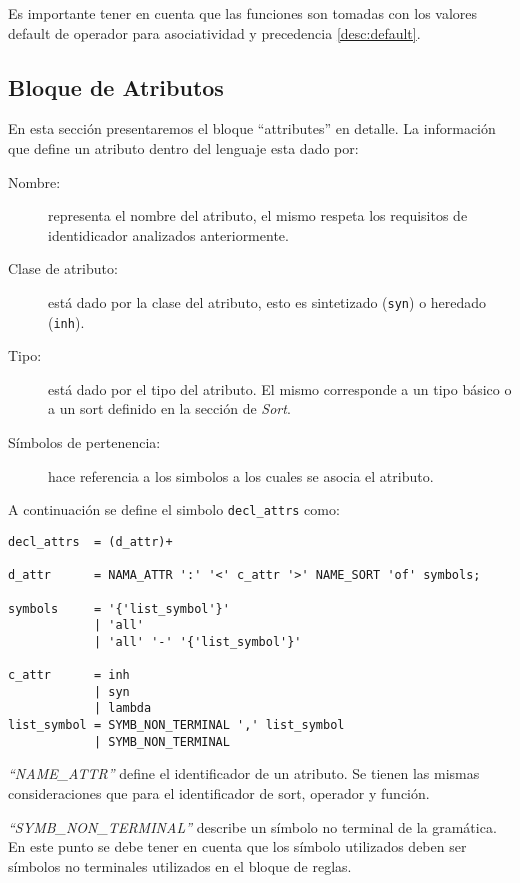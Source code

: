 Es importante tener en cuenta que las funciones son tomadas con los valores default de operador para asociatividad y precedencia \ref{desc:default}.\\
\subsection{Bloque de Atributos}
En esta sección presentaremos el bloque ``attributes'' en detalle. La información que define un atributo dentro del lenguaje esta dado por: 
\begin{description}
\item [Nombre:] representa el nombre del atributo, el mismo respeta los requisitos de identidicador analizados anteriormente.
\item [Clase de atributo:] está dado por la clase del atributo, esto es sintetizado (\texttt{syn}) o heredado (\texttt{inh}).
\item [Tipo:] está dado por el tipo del atributo. El mismo corresponde a un tipo básico o a un sort definido en la sección de \textit{Sort}.
\item [Símbolos de pertenencia:] hace referencia a los simbolos a los cuales se asocia el atributo.
\end{description}

A continuación se define el simbolo \texttt{decl\_attrs} como:
\begin{center}
\lstset{language=inform}
\scriptsize
\begin{lstlisting}[frame=single]
decl_attrs  = (d_attr)+ 

d_attr      = NAMA_ATTR ':' '<' c_attr '>' NAME_SORT 'of' symbols;

symbols     = '{'list_symbol'}' 
            | 'all'
            | 'all' '-' '{'list_symbol'}'

c_attr      = inh
            | syn
            | lambda
list_symbol = SYMB_NON_TERMINAL ',' list_symbol
            | SYMB_NON_TERMINAL 
\end{lstlisting}
\end{center}
\textit{``NAME\_ATTR''} define el identificador de un atributo. Se tienen las mismas consideraciones que para el identificador de sort, operador y función.

\textit{``SYMB\_NON\_TERMINAL''} describe un símbolo no terminal de la gramática. En este punto se debe tener en cuenta que los símbolo utilizados deben ser símbolos no terminales utilizados en el bloque de reglas.

